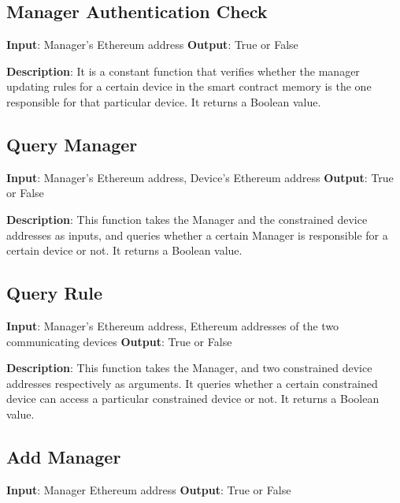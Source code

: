 \documentclass[english]{tktltiki}
\begin{document}
\newpage
{}
\subsection*{Manager Authentication Check}
\textbf{Input}: Manager's Ethereum address\newline
\textbf{Output}: True or False\newline

\textbf{Description}: It is a constant function that verifies whether the manager updating rules for a certain device in the smart contract memory is the one responsible for that particular device. It returns a Boolean value.

\subsection*{Query Manager}
\textbf{Input}: Manager's Ethereum address, Device's Ethereum address\newline
\textbf{Output}: True or False\newline

\textbf{Description}: This function takes the Manager and the constrained device addresses as inputs, and queries whether a certain Manager is responsible for a certain device or not. It returns a Boolean value. 

\subsection*{Query Rule}
\textbf{Input}: Manager's Ethereum address, Ethereum addresses of the two communicating devices\newline
\textbf{Output}: True or False\newline

\textbf{Description}: This function takes the Manager, and two constrained device addresses respectively as arguments. It queries whether a certain constrained device can access a particular constrained device or not. It returns a Boolean value.
\newline
\newline
\newline


\subsection*{Add Manager}
\textbf{Input}: Manager Ethereum address\newline
\textbf{Output}: True or False\newline
\end{document}
